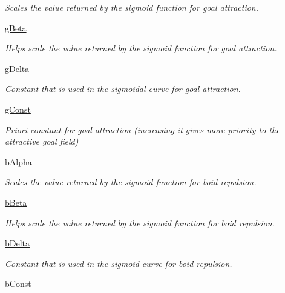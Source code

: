 \begin{DoxyCompactItemize}
\begin{DoxyCompactList}\small\item\em Scales the value returned by the sigmoid function for goal attraction. \end{DoxyCompactList}\item 
\hyperlink{classboid_1_1Boid_a2c33a265be5079b7b916be49933eccaf}{g\-Beta}
\begin{DoxyCompactList}\small\item\em Helps scale the value returned by the sigmoid function for goal attraction. \end{DoxyCompactList}\item 
\hyperlink{classboid_1_1Boid_a17cd80cfac0fb27106c12e45929f9a9f}{g\-Delta}
\begin{DoxyCompactList}\small\item\em Constant that is used in the sigmoidal curve for goal attraction. \end{DoxyCompactList}\item 
\hyperlink{classboid_1_1Boid_a71d768a5bc70ecfcaec719cfd0c310ef}{g\-Const}
\begin{DoxyCompactList}\small\item\em Priori constant for goal attraction (increasing it gives more priority to the attractive goal field) \end{DoxyCompactList}\item 
\hyperlink{classboid_1_1Boid_abc7224afe02b42ee1c32ecd15d1b0a22}{b\-Alpha}
\begin{DoxyCompactList}\small\item\em Scales the value returned by the sigmoid function for boid repulsion. \end{DoxyCompactList}\item 
\hyperlink{classboid_1_1Boid_a1a48be012c505eea2e1b9f110d9bd5f3}{b\-Beta}
\begin{DoxyCompactList}\small\item\em Helps scale the value returned by the sigmoid function for boid repulsion. \end{DoxyCompactList}\item 
\hyperlink{classboid_1_1Boid_afebd87123c129406ee9e8c99f85f66a7}{b\-Delta}
\begin{DoxyCompactList}\small\item\em Constant that is used in the sigmoid curve for boid repulsion. \end{DoxyCompactList}\item 
\hyperlink{classboid_1_1Boid_a868b1d8e6fadd2b1beedc1a9f23edde5}{b\-Const}

\end{DoxyCompactItemize}
